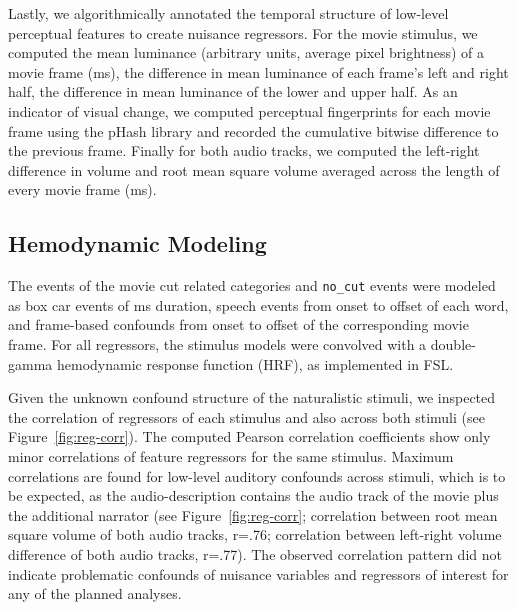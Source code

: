 \documentclass[english,11pt]{article}
\begin{document}
Lastly, we algorithmically annotated the temporal structure of low-level
perceptual features to create nuisance regressors.
For the movie stimulus, we computed the mean luminance (arbitrary units,
average pixel brightness) of a movie frame (\unit[40]{ms}), the difference in
mean luminance of each frame's left and right half, the difference in mean
luminance of the lower and upper half. As an indicator of visual change, we
computed perceptual fingerprints for each movie frame using the pHash library
\citep{zauner2010implementation} and recorded the cumulative bitwise
difference to the previous frame.
Finally for both audio tracks, we computed the left-right difference in volume
and root mean square volume averaged across the length of every movie frame
(\unit[40]{ms}).


\subsection*{Hemodynamic Modeling}

The events of the movie cut related categories and \texttt{no\_cut} events were
modeled as box car events of \unit[200]{ms} duration,
%
speech events from onset to offset of each word, and frame-based confounds from
onset to offset of the corresponding movie frame.
For all regressors, the stimulus models were convolved with a double-gamma
hemodynamic response function (HRF), as implemented in FSL.

Given the unknown confound structure of the naturalistic stimuli, we inspected
the correlation of regressors of each stimulus and
also across both stimuli (see Figure~\ref{fig:reg-corr}).
The computed Pearson correlation coefficients show only minor correlations of
feature regressors for the same stimulus.
Maximum correlations are found for low-level auditory confounds across
stimuli,
which is to be expected, as the audio-description contains the audio track of
the movie plus the additional narrator (see Figure~\ref{fig:reg-corr}; correlation
between root mean square volume of both audio tracks, r=.76; correlation between
left-right volume difference of both audio tracks, r=.77).
The observed correlation pattern did not indicate problematic confounds of
nuisance variables and regressors of interest for any of the planned analyses.
\end{document}
